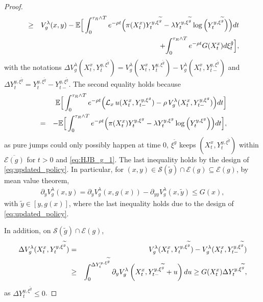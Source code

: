 \documentclass[11pt]{amsart}
\theoremstyle{plain}
\def \dd{{\rm d}}
\numberwithin{equation}{section}
\begin{document}
\begin{proof}
{\begin{eqnarray}
      &\geq &V^\lambda_g(x,y) -\mathbb{E}\Big[\int_0^{\tau_R\wedge T} e^{-\rho t} \Big(\pi(X^x_t)Y_t^{y,\xi^{\widetilde{g}}} - \lambda  Y_t^{y, \xi^{\widetilde{g}}} \log\Big(Y_t^{y, \xi^{\widetilde{g}}}\Big) \Big)\dd t\nonumber\\
     && + {\int_0^{\tau_R\wedge T} e^{-\rho t}G(X_t^x)\dd \xi^{\tilde g}_t}\Big],\label{eq:V_g_ineq}
\end{eqnarray}}
\noindent with the notations $\Delta V^\lambda_g(X^x_t,Y^{y,\xi^{\widetilde{g}}}_{t}) =V^\lambda_g(X^x_t,Y^{y,\xi^{\widetilde{g}}}_{t})-V^\lambda_g(X^x_t,Y^{y,\xi^{\widetilde{g}}}_{t-})$ and $\Delta Y_t^{y,\xi^{\widetilde{g}}} =Y_{t}^{y,\xi^{\widetilde{g}}}-Y_{t-}^{y,\xi^{\widetilde{g}}}$. 
The second equality holds because 
    \begin{eqnarray*}
      &&   \mathbb{E}\Big[\int_0^{\tau_R\wedge T} e^{-\rho t} \Big(\mathcal{L}_x\,u(X^x_t,Y^{ y,\xi^g}_{t-})-\rho\, V^\lambda_g(X^x_t,Y^{ y,\xi^g}_{t-})\Big) \dd t \Big] \\
         &=& -\mathbb{E}\Big[\int_0^{\tau_R\wedge T} e^{-\rho t} \Big(\pi(X^x_t)Y_t^{ y,\xi^g} - \lambda  Y_t^{ y,\xi^g} \log\Big(Y_t^{ y,\xi^g}\Big) \Big)\dd t\Big],
    \end{eqnarray*} 
    as pure jumps could only possibly happen at time $0$,  $\xi^{\widetilde{g}}$ keeps $(X^x_t,Y_t^{y,\xi^{\widetilde{g}}})$ within $\overline{\mathcal{E}(g)}$ for $t >0$ and  \eqref{eq:HJB_g_1}. 
    The last inequality holds by the design of  \eqref{eq:updated_policy}. 
    In particular,  for $(x,y)\in \mathcal{S}( \widetilde{g})\cap \mathcal{E}(g)\subseteq \mathcal{E}(g)$, by mean value theorem,
\begin{eqnarray*}
    \partial_y V^\lambda_g(x,y) =  \partial_y V^\lambda_g(x,g(x)) -\partial_{yy} V^\lambda_g(x,\tilde{y})  \leq G(x),
\end{eqnarray*}
with $\tilde y\in[y,g(x)]$, where the last inequality holds due to the design of \eqref{eq:updated_policy}.
    
    In addition, on $\mathcal{S}( \widetilde{g})\cap \mathcal{E}(g)$,
\begin{eqnarray*}
    \Delta V^\lambda_g(X^x_t,Y^{y,\xi^{\widetilde{g}}}_{t}) &=&V^\lambda_g(X^x_t,Y^{y,\xi^{\widetilde{g}}}_{t})-V^\lambda_g(X^x_t,Y^{y,\xi^{\widetilde{g}}}_{t-}) \\
    &\ge & \int_0^{\Delta Y^{y,\xi^{\widetilde{g}}}_t} \partial_y V^\lambda_g\left(X^x_t,Y^{y,\xi^{\widetilde{g}}}_{t-}+u\right) {\rm d} u \ge G(X_t^x)\Delta Y^{y,\xi^{\widetilde{g}}}_t,
\end{eqnarray*}    
as $\Delta Y^{y,\xi^{\widetilde{g}}}_t \leq 0$.



\end{proof}
\end{document}
